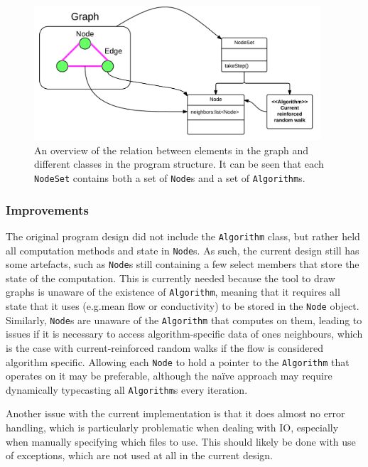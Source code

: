 \begin{figure}[H]
\centering
\includegraphics[width=0.95\textwidth]{img/graphToClass.png}
\caption{An overview of the relation between elements in the graph and different classes in the program structure. It can be seen that each \texttt{NodeSet} contains both a set of \texttt{Node}s and a set of \texttt{Algorithm}s.}
\label{fig:graphToClass}
\end{figure}

\subsubsection{Improvements}

The original program design did not include the \texttt{Algorithm} class, but rather held all computation methods and state in \texttt{Node}s. As such, the current design still has some artefacts, such as \texttt{Node}s still containing a few select members that store the state of the computation. This is currently needed because the tool to draw graphs is unaware of the existence of \texttt{Algorithm}, meaning that it requires all state that it uses (e.g.\@ mean flow or conductivity) to be stored in the \texttt{Node} object. Similarly, \texttt{Node}s are unaware of the \texttt{Algorithm} that computes on them, leading to issues if it is necessary to access algorithm-specific data of ones neighbours, which is the case with current-reinforced random walks if the flow is considered algorithm specific. Allowing each \texttt{Node} to hold a pointer to the \texttt{Algorithm} that operates on it may be preferable, although the na\"{i}ve approach may require dynamically typecasting all \texttt{Algorithm}s every iteration.

Another issue with the current implementation is that it does almost no error handling, which is particularly problematic when dealing with IO, especially when manually specifying which files to use. This should likely be done with use of exceptions, which are not used at all in the current design.

